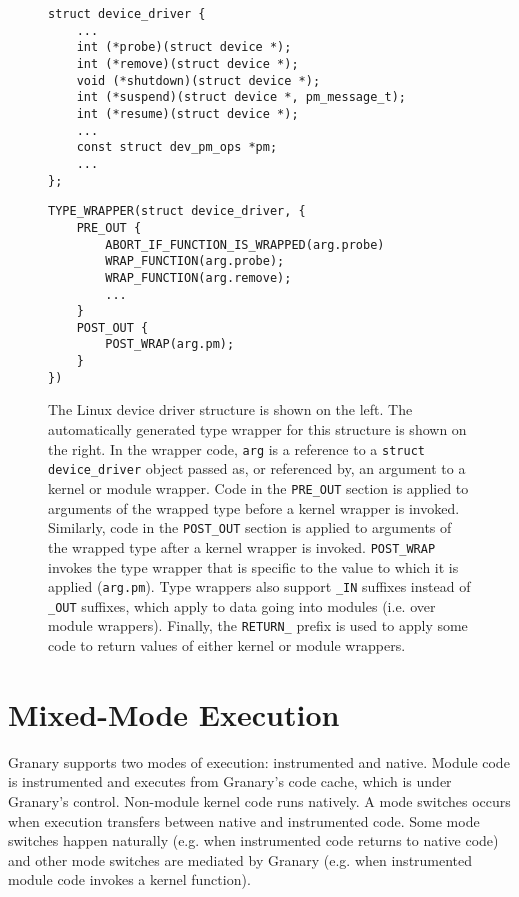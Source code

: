 \documentclass[preprint]{sigplanconf}
\let\ORIGcaption\caption
\begin{document}
\begin{figure*}[t!]
\lstset{language=C, tabsize=2, stepnumber=1}
\begin{multicols}{2}
\begin{lstlisting}[basicstyle=\footnotesize\ttfamily]
struct device_driver {
	...
	int (*probe)(struct device *);
	int (*remove)(struct device *);
	void (*shutdown)(struct device *);
	int (*suspend)(struct device *, pm_message_t);
	int (*resume)(struct device *);
	...
	const struct dev_pm_ops *pm;
	...
};
\end{lstlisting}
\columnbreak
\begin{lstlisting}[basicstyle=\footnotesize\ttfamily]
TYPE_WRAPPER(struct device_driver, {
    PRE_OUT {
        ABORT_IF_FUNCTION_IS_WRAPPED(arg.probe)
        WRAP_FUNCTION(arg.probe);
        WRAP_FUNCTION(arg.remove);
        ...
    }
    POST_OUT {
        POST_WRAP(arg.pm);
    }
})
\end{lstlisting}
\end{multicols}
\ORIGcaption[LoF entry]{The Linux device driver structure is shown on the left. The automatically generated type wrapper for this structure is shown on the right. In the wrapper code, \texttt{arg} is a reference to a \texttt{struct device\_driver} object passed as, or referenced by, an argument to a kernel or module wrapper. Code in the \texttt{PRE\_OUT} section is applied to arguments of the wrapped type before a kernel wrapper is invoked. Similarly, code in the \texttt{POST\_OUT} section is applied to arguments of the wrapped type after a kernel wrapper is invoked. \texttt{POST\_WRAP} invokes the type wrapper that is specific to the value to which it is applied (\texttt{arg.pm}). Type wrappers also support \texttt{\_IN} suffixes instead of \texttt{\_OUT} suffixes, which apply to data going into modules (i.e. over module wrappers). Finally, the \texttt{RETURN\_} prefix is used to apply some code to return values of either kernel or module wrappers.}
\label{fig:type_wrapper}
\end{figure*}

\section{Mixed-Mode Execution}\label{sec:modes}
Granary supports two modes of execution: instrumented and native. Module code is instrumented and executes from Granary's code cache, which is under Granary's control. Non-module kernel code runs natively. A mode switches occurs when execution transfers between native and instrumented code. Some mode switches happen naturally (e.g. when instrumented code returns to native code) and other mode switches are mediated by Granary (e.g. when instrumented module code invokes a kernel function).
\end{document}
